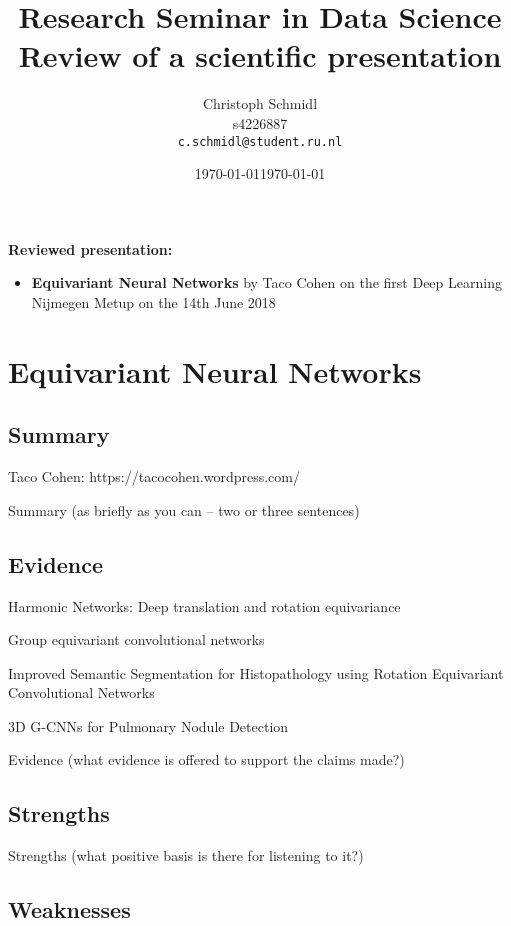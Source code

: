 \documentclass[a4paper]{article}
\title{Research Seminar in Data Science\\Review of a scientific presentation}
\author{
  Christoph Schmidl\\ s4226887\\      \texttt{c.schmidl@student.ru.nl}
}
\date{\today}
\date{\today}
\begin{document}
\maketitle

\textbf{Reviewed presentation:}

\begin{itemize}
	\item \textbf{Equivariant Neural Networks} by Taco Cohen on the first Deep Learning Nijmegen Metup on the 14th June 2018
\end{itemize}


\section{Equivariant Neural Networks}

\subsection{Summary}

Taco Cohen: https://tacocohen.wordpress.com/

Summary (as briefly as you can – two or three sentences)

\subsection{Evidence}

Harmonic Networks: Deep translation and rotation equivariance \cite{worrall2017harmonic}


Group equivariant convolutional networks \cite{cohen2016group}


Improved Semantic Segmentation for Histopathology using Rotation Equivariant Convolutional Networks \cite{winkens2018improved}


3D G-CNNs for Pulmonary Nodule Detection \cite{winkels20183d}


Evidence (what evidence is offered to support the claims made?)

\subsection{Strengths}

Strengths (what positive basis is there for listening to it?)

\subsection{Weaknesses}
\end{document}

